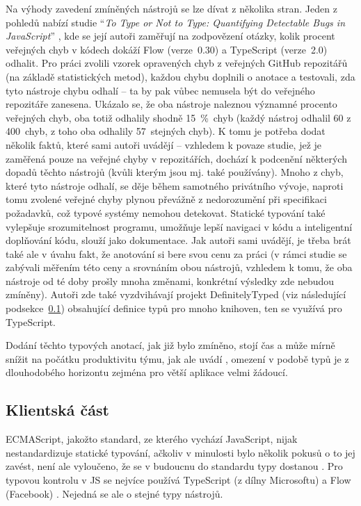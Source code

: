Na výhody zavedení zmíněných nástrojů se lze dívat z několika stran. Jeden z pohledů nabízí studie \enquote{\textit{To Type or Not to Type: Quantifying Detectable Bugs in JavaScript}} \cite{types-study}, kde se její autoři zaměřují na zodpovězení otázky, kolik procent veřejných chyb v kódech dokáží Flow (verze~0.30) a TypeScript (verze~2.0) odhalit. Pro práci zvolili vzorek opravených chyb z veřejných GitHub repozitářů (na základě statistických metod), každou chybu doplnili o anotace a testovali, zda tyto nástroje chybu odhalí -- ta by pak vůbec nemusela být do veřejného repozitáře zanesena. Ukázalo se, že oba nástroje naleznou významné procento veřejných chyb, oba totiž odhalily shodně 15~\%~chyb (každý nástroj odhalil 60 z 400~chyb, z toho oba odhalily 57~stejných chyb). K tomu je potřeba dodat několik faktů, které sami autoři uvádějí -- vzhledem k povaze studie, jež je zaměřená pouze na veřejné chyby v repozitářích, dochází k podcenění některých dopadů těchto nástrojů (kvůli kterým jsou mj. také používány). Mnoho z chyb, které tyto nástroje odhalí, se děje během samotného privátního vývoje, naproti tomu zvolené veřejné chyby plynou převážně z nedorozumění při specifikaci požadavků, což typové systémy nemohou detekovat. Statické typování také vylepšuje srozumitelnost programu, umožňuje lepší navigaci v kódu a inteligentní doplňování kódu, slouží jako dokumentace. Jak autoři sami uvádějí, je třeba brát také ale v úvahu fakt, že anotování si bere svou cenu za práci (v rámci studie se zabývali měřením této ceny a srovnáním obou nástrojů, vzhledem k tomu, že oba nástroje od té doby prošly mnoha změnami, konkrétní výsledky zde nebudou zmíněny). Autoři zde také vyzdvihávají projekt DefinitelyTyped (viz následující podsekce~\ref{subsec:types-frontend}) obsahující definice typů pro mnoho knihoven, ten se využívá pro TypeScript.

Dodání těchto typových anotací, jak již bylo zmíněno, stojí čas a může mírně snížit na počátku produktivitu týmu, jak ale uvádí \cite{types-developerhowto}, omezení v podobě typů je z dlouhodobého horizontu zejména pro větší aplikace velmi žádoucí.

\subsection{Klientská část}\label{subsec:types-frontend}

ECMAScript, jakožto standard, ze kterého vychází JavaScript, nijak nestandardizuje statické typování, ačkoliv v minulosti bylo několik pokusů o to jej zavést, není ale vyloučeno, že se v budoucnu do standardu typy dostanou \cite{types-ecma}. Pro typovou kontrolu v JS se nejvíce používá TypeScript (z dílny Microsoftu) a Flow (Facebook) \cite{types-objectcomputing}. Nejedná se ale o stejné typy nástrojů.

